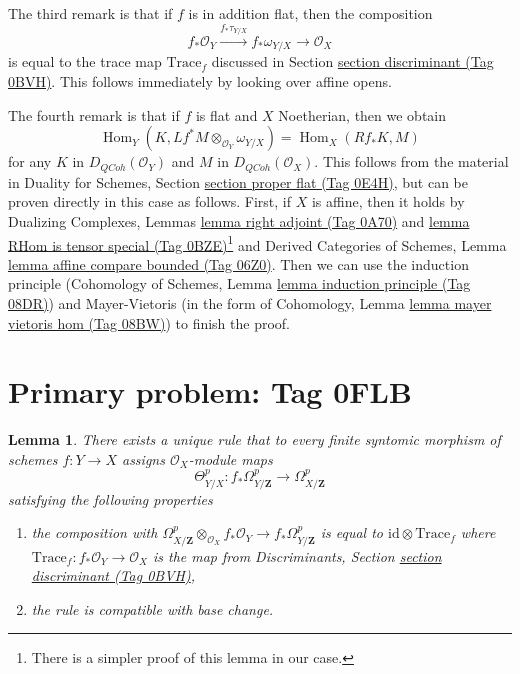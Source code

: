 \documentclass{amsart}
\theoremstyle{plain}
\newtheorem{lemma}[subsection]{Lemma}
\theoremstyle{definition}
\theoremstyle{remark}
\numberwithin{equation}{subsection}
\def\Hom{\mathop{\mathrm{Hom}}\nolimits}
\def\QCoh{\mathit{QCoh}}
\begin{document}
\medskip\noindent
The third remark is that if $f$ is in addition flat, then the
composition
$$
f_*\mathcal{O}_Y \xrightarrow{f_*\tau_{Y/X}} f_*\omega_{Y/X}
\longrightarrow \mathcal{O}_X
$$
is equal to the trace map $\text{Trace}_f$ discussed in
Section \href{https://stacks.math.columbia.edu/tag/0BVH}{section discriminant (Tag 0BVH)}. This follows immediately by
looking over affine opens.

\medskip\noindent
The fourth remark is that if $f$ is flat and $X$ Noetherian, then
we obtain
$$
\Hom_Y(K, Lf^*M \otimes_{\mathcal{O}_Y} \omega_{Y/X})
=
\Hom_X(Rf_*K, M)
$$
for any $K$ in $D_\QCoh(\mathcal{O}_Y)$ and $M$ in $D_\QCoh(\mathcal{O}_X)$.
This follows from the material in
Duality for Schemes, Section \href{https://stacks.math.columbia.edu/tag/0E4H}{section proper flat (Tag 0E4H)},
but can be proven directly in this case as follows.
First, if $X$ is affine, then it holds by
Dualizing Complexes, Lemmas \href{https://stacks.math.columbia.edu/tag/0A70}{lemma right adjoint (Tag 0A70)} and
\href{https://stacks.math.columbia.edu/tag/0BZE}{lemma RHom is tensor special (Tag 0BZE)}\footnote{There is a
simpler proof of this lemma in our case.} and
Derived Categories of Schemes, Lemma \href{https://stacks.math.columbia.edu/tag/06Z0}{lemma affine compare bounded (Tag 06Z0)}.
Then we can use the induction principle
(Cohomology of Schemes, Lemma \href{https://stacks.math.columbia.edu/tag/08DR}{lemma induction principle (Tag 08DR)})
and Mayer-Vietoris
(in the form of Cohomology, Lemma \href{https://stacks.math.columbia.edu/tag/08BW}{lemma mayer vietoris hom (Tag 08BW)})
to finish the proof.









\section*{Primary problem: Tag 0FLB}
\begin{lemma}
\label{lemma-Garel}
There exists a unique rule that to every finite syntomic
morphism of schemes $f : Y \to X$ assigns $\mathcal{O}_X$-module maps
$$
\Theta^p_{Y/X} :
f_*\Omega^p_{Y/\mathbf{Z}}
\longrightarrow
\Omega^p_{X/\mathbf{Z}}
$$
satisfying the following properties
\begin{enumerate}
\item the composition with
$\Omega^p_{X/\mathbf{Z}} \otimes_{\mathcal{O}_X} f_*\mathcal{O}_Y
\to f_*\Omega^p_{Y/\mathbf{Z}}$ is equal to
$\text{id} \otimes \text{Trace}_f$
where $\text{Trace}_f : f_*\mathcal{O}_Y \to \mathcal{O}_X$
is the map from
Discriminants, Section \href{https://stacks.math.columbia.edu/tag/0BVH}{section discriminant (Tag 0BVH)},
\item the rule is compatible with base change.
\end{enumerate}
\end{lemma}
\end{document}
